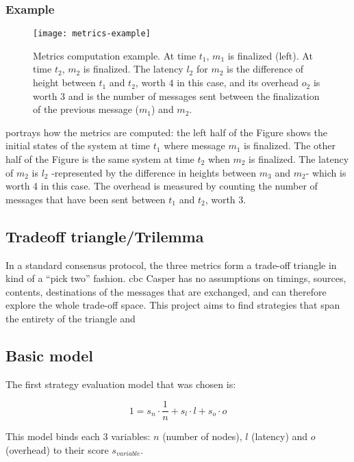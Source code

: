 \subsubsection{Example}

\begin{figure}[h]
	\centering
	\texttt{[image: metrics-example]}
    \caption{Metrics computation example. At time \(t_1\), \(m_1\) is finalized
    (left). At time \(t_2\), \(m_2\) is finalized. The latency \(l_2\) for \(m_2\) is the difference
    of height between \(t_1\) and \(t_2\), worth $4$ in this case, and its
    overhead \(o_2\) is worth $3$ and is the number of messages sent between the
    finalization of the previous message (\(m_1\)) and \(m_2\).}
	\label{fig:metricsSchema}
\end{figure}

 portrays how the metrics are computed: the left half of
the Figure shows the initial states of the system at time \(t_1\) where message
\(m_1\) is finalized. The other half of the Figure is the same system at time
\(t_2\) when \(m_2\) is finalized. The latency of \(m_2\) is \(l_2\)
-represented by the difference in heights between \(m_3\) and \(m_2\)- which is
worth 4 in this case. The overhead is measured by counting the number of
messages that have been sent between \(t_1\) and \(t_2\), worth 3.

\FloatBarrier

\subsection{Tradeoff triangle/Trilemma}
In a standard consensus protocol, the three metrics form a trade-off triangle in
kind of a ``pick two'' fashion.  \gls{cbc} Casper has no
assumptions on timings, sources, contents, destinations of the messages that are
exchanged, and can therefore explore the whole trade-off space. This project
aims to find strategies that span the entirety of the triangle and

\subsection{Basic model}
\label{ssec:model}
The first strategy evaluation model that was chosen is:

\[1 = s_n \cdot \frac{1}{n} + s_l\cdot l + s_o\cdot o\]


This model binds each 3 variables: \(n\) (number of nodes), \(l\) (latency) and
\(o\) (overhead) to their score \(s_{variable}\).

